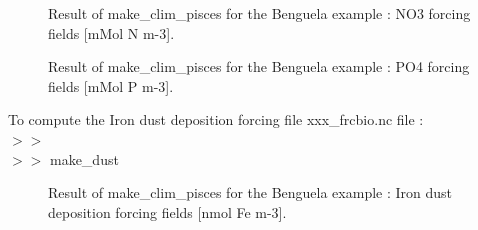 \begin{figure}[!htbp]
%
\hfill
{}
\caption{Result of make\_clim\_pisces for the Benguela example : NO3 forcing
  fields [mMol N m-3].}
\label{fig:makeclimpiscesNO3}
\end{figure}


\begin{figure}[!htbp]
%
\hfill
{}
\caption{Result of make\_clim\_pisces for the Benguela example : PO4 forcing fields
  [mMol P m-3].}
\label{fig:makeclimpiscesNO4}
\end{figure}

\noindent To compute the Iron dust deposition forcing file xxx\_frcbio.nc file :\\
$>>$\\
$>>$ make\_dust\\
\begin{figure}[!htbp]
\centering
{}%
\hfill
\caption{Result of make\_clim\_pisces for the Benguela example : Iron dust deposition
  forcing fields [nmol Fe m-3].}
\label{fig:makeclimpiscesNO4}
\end{figure}